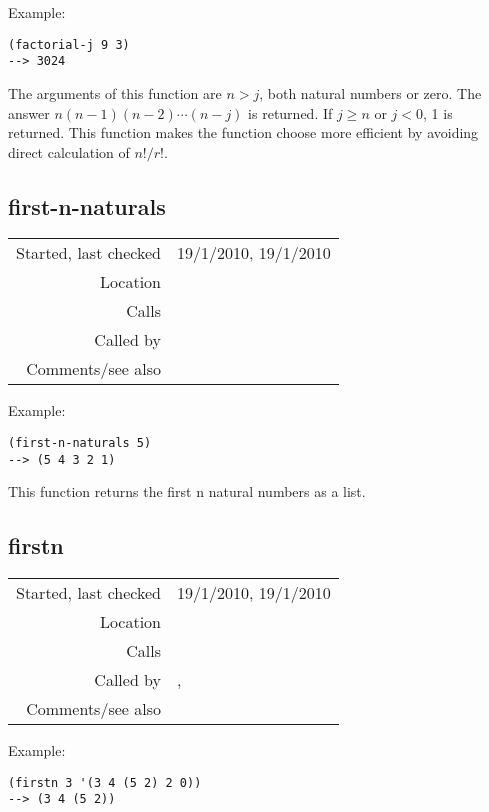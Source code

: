 \vspace{0.5cm}
\noindent Example:
\begin{verbatim}
(factorial-j 9 3)
--> 3024
\end{verbatim}

\noindent The arguments of this function are $n > j$,
both natural numbers or zero. The answer
$n(n-1)(n-2)\cdots (n-j)$ is returned. If $j \geq n$
or $j < 0$, 1 is returned. This function makes the
function choose more efficient by avoiding direct
calculation of $n!/r!$.


\subsection*{first-n-naturals}\label{fun:first-n-naturals}

\vspace{0.3cm}
\begin{tabular}{r|p{8cm}}
Started, last checked & 19/1/2010, 19/1/2010 \\
Location & \nameref{sec:list-processing} \\
Calls & \\
Called by & \\
Comments/see also & 
\end{tabular}

\vspace{0.5cm}
\noindent Example:
\begin{verbatim}
(first-n-naturals 5)
--> (5 4 3 2 1)
\end{verbatim}

\noindent This function returns the first n natural
numbers as a list.


\subsection*{firstn}\label{fun:firstn}

\vspace{0.3cm}
\begin{tabular}{r|p{8cm}}
Started, last checked & 19/1/2010, 19/1/2010 \\
Location & \nameref{sec:list-processing} \\
Calls & \\
Called by & \nameref{fun:add-to-nth}, \nameref{fun:remove-nth} \\
Comments/see also & 
\end{tabular}

\vspace{0.5cm}
\noindent Example:
\begin{verbatim}
(firstn 3 '(3 4 (5 2) 2 0))
--> (3 4 (5 2))
\end{verbatim}

